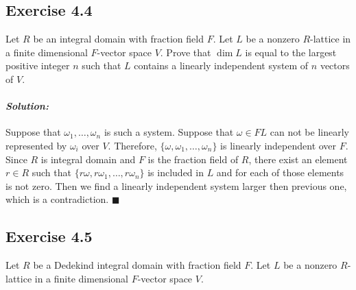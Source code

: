 \documentclass[12pt, a4paper]{article}
\newenvironment{solution}
  {\paragraph{\textit{Solution:}}\par\medskip}
  {\hfill$\blacksquare$\vspace{0.1cm}}
\begin{document}
\subsection*{Exercise 4.4}
Let $R$ be an integral domain with fraction field $F$. Let $L$ be a nonzero $R$-lattice in a finite dimensional $F$-vector space $V$.
Prove that $\dim L$ is equal to the largest positive integer $n$ such that $L$ contains a linearly independent system of $n$ vectors of $V$.

\begin{solution}
    Suppose that $\omega_1,\dots,\omega_n$ is such a system. Suppose that $\omega\in FL$
    can not be linearly represented by $\omega_i$ over $V$. Therefore, $\{\omega,\omega_1,\dots,\omega_n\}$ is linearly independent over $F$.
    Since $R$ is integral domain and $F$ is the fraction field of $R$, there exist an element $r\in R$ such that $\{r\omega,r\omega_1,\dots,r\omega_n\}$
    is included in $L$ and for each of those elements is not zero.
    Then we find a linearly independent system larger then previous one, which is a contradiction.
\end{solution}

\subsection*{Exercise 4.5}
Let $R$ be a Dedekind integral domain with fraction field $F$. Let $L$ be a nonzero $R$-lattice in a finite dimensional $F$-vector space $V$.
\end{document}
